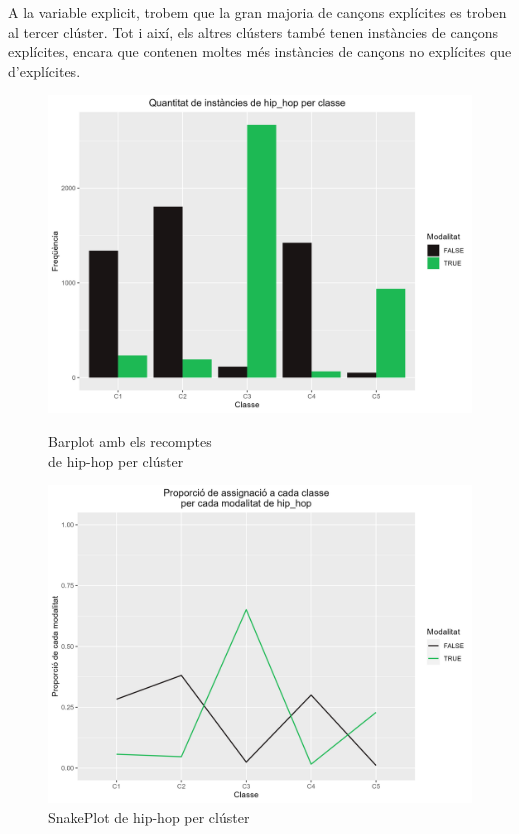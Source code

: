 A la variable explicit, trobem que la gran majoria de cançons explícites es troben al tercer clúster. Tot i així, els altres clústers també tenen instàncies de cançons explícites, encara que contenen moltes més instàncies de cançons no explícites que d'explícites.

\begin{figure}[H]
\centering
    \begin{minipage}{.49\textwidth}
        \centering
        \includegraphics[width=0.95\linewidth]{Images/5_Profiling/categoriques/cat/Cat_BarPlot_hip_hop.png}
        \caption{Barplot amb els recomptes \\ de hip-hop per clúster}
        \label{fig:Cat_BarPlot_hip_hop}
    \end{minipage}%
    \begin{minipage}{.49\textwidth}
        \centering
        \includegraphics[width=0.95\linewidth]{Images/5_Profiling/categoriques/cat/Cat_SnakePlot_hip_hop.png}
        \caption{SnakePlot de hip-hop per clúster}
        \label{fig:Cat_SnakePlot_hip_hop}
    \end{minipage}%
\end{figure}

